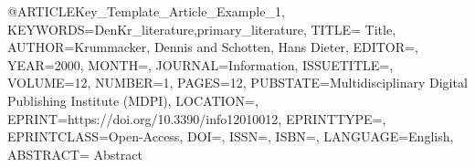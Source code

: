 @ARTICLE{Key_Template_Article_Example_1,
    KEYWORDS={DenKr_literature,primary_literature},
    TITLE={\begingroup
        Title\endgroup},
    AUTHOR={Krummacker, Dennis and Schotten, Hans Dieter},
    EDITOR={},
    YEAR={2000},
    MONTH={},
    JOURNAL={Information},
    ISSUETITLE={},
    VOLUME={12},
    NUMBER={1},
    PAGES={12},
    PUBSTATE={Multidisciplinary Digital Publishing Institute (MDPI)},
    LOCATION={},
    EPRINT={https://doi.org/10.3390/info12010012},
    EPRINTTYPE={},
    EPRINTCLASS={Open-Access},
    DOI={},
    ISSN={},
    ISBN={},
    LANGUAGE={English},
    ABSTRACT={\begingroup
        Abstract\endgroup}
}